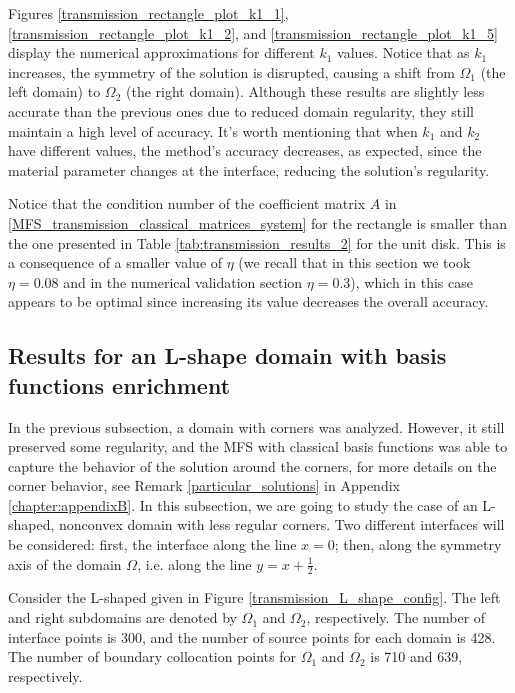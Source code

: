 Figures \ref{transmission_rectangle_plot_k1_1}, \ref{transmission_rectangle_plot_k1_2}, and \ref{transmission_rectangle_plot_k1_5} display the numerical approximations for different \(k_1\) values. Notice that as \(k_1\) increases, the symmetry of the solution is disrupted, causing a shift from \(\Omega_1\) (the left domain) to \(\Omega_2\) (the right domain). Although these results are slightly less accurate than the previous ones due to reduced domain regularity, they still maintain a high level of accuracy. It's worth mentioning that when \(k_1\) and \(k_2\) have different values, the method's accuracy decreases, as expected, since the material parameter changes at the interface, reducing the solution's regularity.

Notice that the condition number of the coefficient matrix \(A\) in \eqref{MFS_transmission_classical_matrices_system} for the rectangle is smaller than the one presented in Table \ref{tab:transmission_results_2} for the unit disk. This is a consequence of a smaller value of \(\eta\) (we recall that in this section we took \(\eta=0.08\) and in the numerical validation section \(\eta=0.3\)), which in this case appears to be optimal since increasing its value decreases the overall accuracy.

\subsection{Results for an L-shape domain with basis functions enrichment}

In the previous subsection, a domain with corners was analyzed. However, it still preserved some regularity, and the \ac{MFS} with classical basis functions was able to capture the behavior of the solution around the corners, for more details on the corner behavior, see Remark \ref{particular_solutions} in Appendix \ref{chapter:appendixB}. In this subsection, we are going to study the case of an L-shaped, nonconvex domain with less regular corners. Two different interfaces will be considered: first, the interface along the line \(x=0\); then, along the symmetry axis of the domain \(\Omega\), i.e. along the line \(y=x+\frac{1}{2}\).

Consider the L-shaped given in Figure \ref{transmission_L_shape_config}. The left and right subdomains are denoted by \(\Omega_1\) and \(\Omega_2\), respectively. The number of interface points is 300, and the number of source points for each domain is 428. The number of boundary collocation points for \(\Omega_1\) and \(\Omega_2\) is 710 and 639, respectively.

